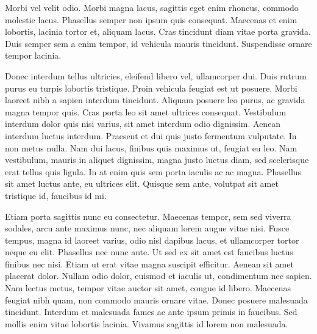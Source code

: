 \documentclass{report}
\begin{document}
Morbi vel velit odio. Morbi magna lacus, sagittis eget enim rhoncus, commodo molestie lacus. Phasellus semper non ipsum quis consequat. Maecenas et enim lobortis, lacinia tortor et, aliquam lacus. Cras tincidunt diam vitae porta gravida. Duis semper sem a enim tempor, id vehicula mauris tincidunt. Suspendisse ornare tempor lacinia.

Donec interdum tellus ultricies, eleifend libero vel, ullamcorper dui. Duis rutrum purus eu turpis lobortis tristique. Proin vehicula feugiat est ut posuere. Morbi laoreet nibh a sapien interdum tincidunt. Aliquam posuere leo purus, ac gravida magna tempor quis. Cras porta leo sit amet ultrices consequat. Vestibulum interdum dolor quis nisi varius, sit amet interdum odio dignissim. Aenean interdum luctus interdum. Praesent et dui quis justo fermentum vulputate. In non metus nulla. Nam dui lacus, finibus quis maximus ut, feugiat eu leo. Nam vestibulum, mauris in aliquet dignissim, magna justo luctus diam, sed scelerisque erat tellus quis ligula. In at enim quis sem porta iaculis ac ac magna. Phasellus sit amet luctus ante, eu ultrices elit. Quisque sem ante, volutpat sit amet tristique id, faucibus id mi.

Etiam porta sagittis nunc eu consectetur. Maecenas tempor, sem sed viverra sodales, arcu ante maximus nunc, nec aliquam lorem augue vitae nisi. Fusce tempus, magna id laoreet varius, odio nisl dapibus lacus, et ullamcorper tortor neque eu elit. Phasellus nec nunc ante. Ut sed ex sit amet est faucibus luctus finibus nec nisi. Etiam ut erat vitae magna suscipit efficitur. Aenean sit amet placerat dolor. Nullam odio dolor, euismod et iaculis ut, condimentum nec sapien. Nam lectus metus, tempor vitae auctor sit amet, congue id libero. Maecenas feugiat nibh quam, non commodo mauris ornare vitae. Donec posuere malesuada tincidunt. Interdum et malesuada fames ac ante ipsum primis in faucibus. Sed mollis enim vitae lobortis lacinia. Vivamus sagittis id lorem non malesuada. 
\end{document}
